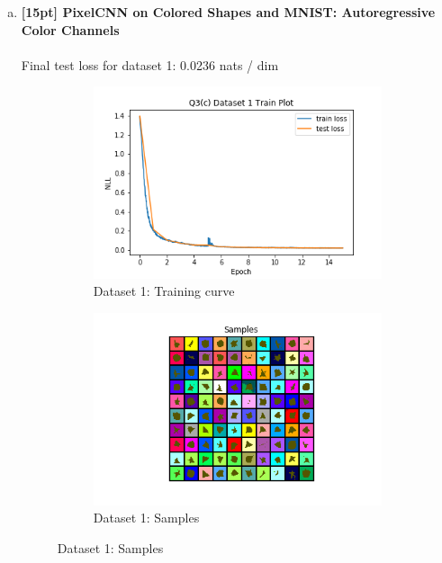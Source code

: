 \documentclass{article}
\begin{document}
\begin{enumerate}[(a)]
\newpage

\item {\bf [15pt] PixelCNN on Colored Shapes and MNIST: Autoregressive Color Channels} \\\\
Final test loss for dataset 1: 0.0236  nats / dim
\begin{figure}[H]
    \centering
    \begin{subfigure}{0.45\textwidth}
        \centering
        \includegraphics[width=\textwidth]{figures/q3_c_dset1_train_plot.png}
        \caption{Dataset 1: Training curve}
    \end{subfigure}
    \hspace{0.2in}
    \begin{subfigure}{0.45\textwidth}
        \centering
        \includegraphics[width=\textwidth]{figures/q3_c_dset1_samples.png}
        \caption{Dataset 1: Samples}

\end{subfigure}
\end{figure}
\end{enumerate}
\end{document}
